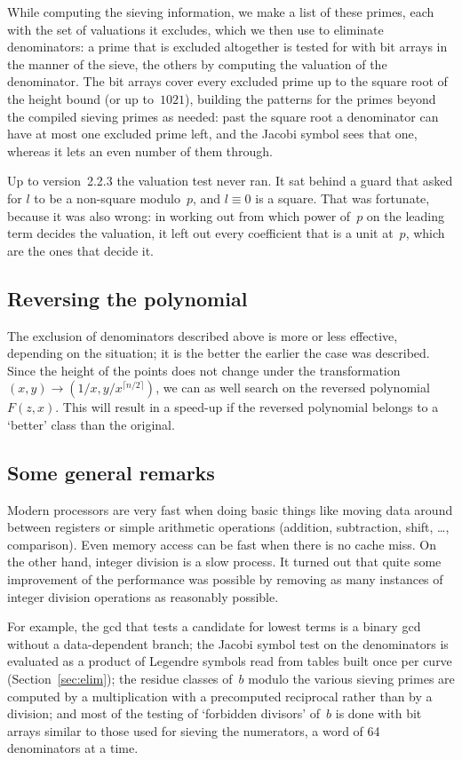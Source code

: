 \documentclass[12pt,a4paper,oneside]{amsart}
\begin{document}
While computing the sieving information, we make a list of these primes,
each with the set of valuations it excludes, which we then use to eliminate
denominators: a prime that is excluded altogether is tested for with bit
arrays in the manner of the sieve, the others by computing the valuation of
the denominator. The bit arrays cover every excluded prime up to the square
root of the height bound (or up to~$1021$), building the patterns for the
primes beyond the compiled sieving primes as needed: past the square root a
denominator can have at most one excluded prime left, and the Jacobi symbol
sees that one, whereas it lets an even number of them through.

Up to version~2.2.3 the valuation test never ran. It sat behind a guard that
asked for $l$ to be a non-square modulo~$p$, and $l \equiv 0$ is a square.
That was fortunate, because it was also wrong: in working out from which
power of~$p$ on the leading term decides the valuation, it left out every
coefficient that is a unit at~$p$, which are the ones that decide it.

\subsection{Reversing the polynomial}

The exclusion of denominators described above is more or less effective,
depending on the situation; it is the better the earlier the case was
described. Since the height of the points does not change under the
transformation $(x,y) \to (1/x, y/x^{\lceil n/2 \rceil})$, we can as well search on the
reversed polynomial $F(z,x)$. This will result in a speed-up if the
reversed polynomial belongs to a `better' class than the original.

\subsection{Some general remarks}

Modern processors are very fast when doing basic things like moving
data around between registers or simple arithmetic operations (addition,
subtraction, shift, \dots, comparison). Even memory access can be fast
when there is no cache miss. On the other hand, integer division is a
slow process. It turned out that quite some improvement of the performance
was possible by removing as many instances of integer division operations
as reasonably possible.

For example, the gcd that tests a candidate for lowest terms is a binary
gcd without a data-dependent branch; the Jacobi symbol test on the
denominators is evaluated as a product of Legendre symbols read from tables
built once per curve (Section~\ref{sec:elim}); the residue classes of~$b$
modulo the various sieving primes are computed by a multiplication with a
precomputed reciprocal rather than by a division; and most of the testing of
`forbidden divisors' of~$b$ is done with bit arrays similar to those used
for sieving the numerators, a word of 64 denominators at a time.
\end{document}
